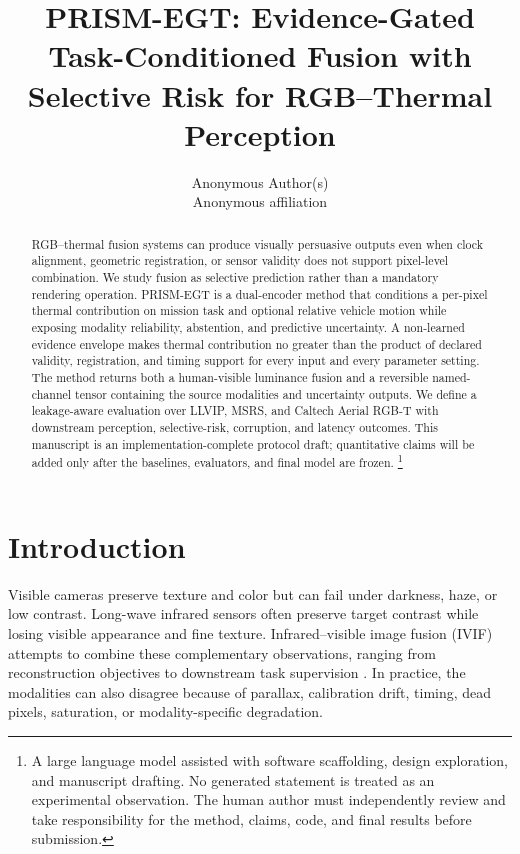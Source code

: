 \documentclass[10pt]{article}
\title{PRISM-EGT: Evidence-Gated Task-Conditioned Fusion with Selective Risk for RGB--Thermal Perception}
\author{\name Anonymous Author(s) \\
      \addr Anonymous affiliation}
\begin{document}
\maketitle

\begin{abstract}
RGB--thermal fusion systems can produce visually persuasive outputs even when
clock alignment, geometric registration, or sensor validity does not support
pixel-level combination. We study fusion as selective prediction rather than a
mandatory rendering operation. PRISM-EGT is a dual-encoder method that
conditions a per-pixel thermal contribution on mission task and optional
relative vehicle motion while exposing modality reliability, abstention, and
predictive uncertainty. A non-learned evidence envelope makes thermal
contribution no greater than the product of declared validity, registration,
and timing support for every input and every parameter setting. The method
returns both a human-visible luminance fusion and a reversible named-channel
tensor containing the source modalities and uncertainty outputs. We define a
leakage-aware evaluation over LLVIP, MSRS, and Caltech Aerial RGB-T with
downstream perception, selective-risk, corruption, and latency outcomes. This
manuscript is an implementation-complete protocol draft; quantitative claims
will be added only after the baselines, evaluators, and final model are frozen.
\footnote{A large language model assisted with software scaffolding, design
exploration, and manuscript drafting. No generated statement is treated as an
experimental observation. The human author must independently review and take
responsibility for the method, claims, code, and final results before
submission.}
\end{abstract}

\section{Introduction}

Visible cameras preserve texture and color but can fail under darkness, haze,
or low contrast. Long-wave infrared sensors often preserve target contrast
while losing visible appearance and fine texture. Infrared--visible image
fusion (IVIF) attempts to combine these complementary observations, ranging
from reconstruction objectives to downstream task supervision
\citep{tang2022seafusion,zhao2023cddfuse,liu2023paif}. In practice, the
modalities can also disagree because of parallax, calibration drift, timing,
dead pixels, saturation, or modality-specific degradation.
\end{document}
